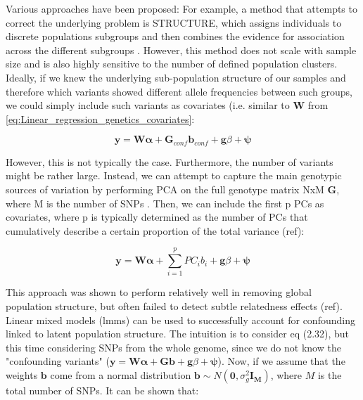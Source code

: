 Various approaches have been proposed:
For example, a method that attempts to correct the underlying problem is STRUCTURE, which assigns individuals to discrete populations subgroups and then combines the evidence for association across the different subgroups \cite{pritchard2000inference}. 
However, this method does not scale with sample size and is also highly sensitive to the number of defined population clusters.\\

Ideally, if we knew the underlying sub-population structure of our samples and therefore which variants showed different allele frequencies between such groups, we could simply include such variants as covariates (i.e. similar to $\mathbf{W}$ from \eqref{eq:Linear_regression_genetics_covariates}:

\begin{equation}
    \mathbf{y} =  \mathbf{W}\boldsymbol{\alpha} +  \mathbf{G}_{conf}\mathbf{b}_{conf} + \mathbf{g}\beta + \boldsymbol{\psi} 
\end{equation}

However, this is not typically the case.
Furthermore, the number of variants might be rather large.
Instead, we can attempt to capture the main genotypic sources of variation by performing PCA on the full genotype matrix NxM $\mathbf{G}$, where M is the number of SNPs \cite{price2006principal}.
Then, we can include the first p PCs as covariates, where p is typically determined as the number of PCs that cumulatively describe a certain proportion of the total variance (ref):

\begin{equation}
    \mathbf{y} =  \mathbf{W}\boldsymbol{\alpha} + \sum_{i=1}^{p} PC_i b_i + \mathbf{g}\beta + \boldsymbol{\psi} 
\end{equation}

This approach was shown to perform relatively well in removing global population structure, but often failed to detect subtle relatedness effects (ref).\\

Linear mixed models (\gls{lmm}s) can be used to successfully account for confounding linked to latent population structure.
The intuition is to consider eq (2.32), but this time considering SNPs from the whole genome, since we do not know the "confounding variants" ($\mathbf{y} =  \mathbf{W}\boldsymbol{\alpha} +  \mathbf{G}\mathbf{b} + \mathbf{g}\beta + \boldsymbol{\psi}$).
Now, if we assume that the weights $\mathbf{b}$ come from a normal distribution $\mathbf{b} \sim N(\mathbf{0},\sigma^2_g\mathbf{I_M})$, where $M$ is the total number of SNPs.
It can be shown that:

